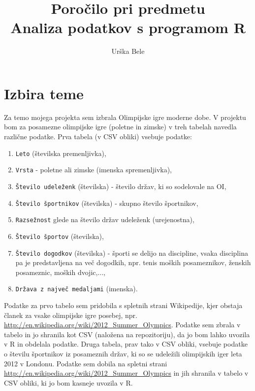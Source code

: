 \documentclass[11pt,a4paper]{article}
\begin{document}
\title{Poročilo pri predmetu \\
Analiza podatkov s programom R}
\author{Urška Bele}
\maketitle

\section{Izbira teme}

Za temo mojega projekta sem izbrala Olimpijske igre moderne dobe.
V projektu bom za posamezne olimpijske igre (poletne in zimske) v treh tabelah navedla različne podatke. \newline
Prva tabela (v CSV obliki) vsebuje podatke:
\begin{enumerate}
\item{\verb|Leto| (številska premenljivka),}
\item{\verb|Vrsta| - poletne ali zimske (imenska spremenljivka),}
\item{ \verb|Število udeleženk| (številska) - število držav, ki so sodelovale na OI,}
\item{\verb|Število športnikov| (številska) - skupno število športnikov,}
\item{\verb|Razsežnost| glede na število držav udeleženk (urejenostna),}
\item{\verb|Število športov| (številska),}
\item{\verb|Število dogodkov| (številska) - športi se delijo na discipline, vsaka disciplina pa je predstavljena na več dogodkih, npr. tenis moških posameznikov, ženskih posameznic, moških dvojic,...,}
\item{\verb|Država z največ medaljami| (imenska).}
\end{enumerate}
Podatke za prvo tabelo sem pridobila s spletnih strani
 Wikipedije, kjer obstaja članek za vsake olimpijske igre posebej, npr.
\url{http://en.wikipedia.org/wiki/2012_Summer_Olympics}. 
 Podatke sem zbrala v tabelo in jo shranila kot CSV (naložena na repozitoriju), da jo bom lahko uvozila v R 
 in obdelala podatke.
\newline
Druga tabela, prav tako v CSV obliki, vsebuje podatke o številu športnikov iz posameznih držav, ki so se udeležili 
olimpijskih iger leta 2012 v Londonu. Podatke sem dobila na spletni strani \url{http://en.wikipedia.org/wiki/2012_Summer_Olympics} in jih shranila v tabelo v CSV obliki, ki jo bom kasneje uvozila v R.
\newline
\end{document}
